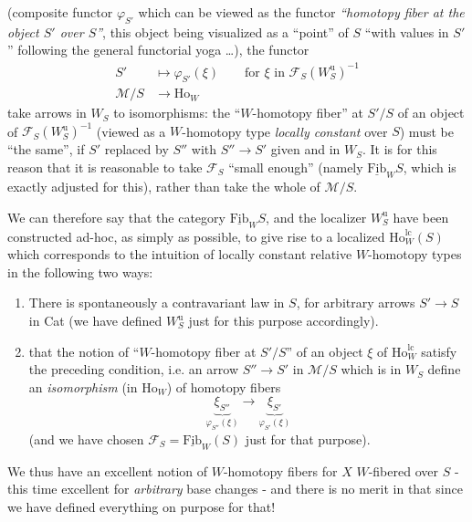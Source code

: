 \documentclass[11pt]{article}
\newcommand{\printedpage}[1]{\marginpar{\footnotesize p.~#1}}
\newcommand{\msp}[1]{\marginpar{\footnotesize [#1]}}
\newcommand{\cM}{\mathcal{M}}
\newcommand{\cF}{\mathcal{F}}
\newcommand{\Ho}{\mathrm{Ho}}
\newcommand{\Fib}{\underline{\mathrm{Fib}}}
\newcommand{\Wu}{W^{\mathrm{u}}}
\newcommand{\lc}{\mathrm{lc}}
\begin{document}
(composite functor $\varphi_{S'}$ which can be viewed as the functor \textit{``homotopy fiber at the object $S'$ over $S$''}, this object being visualized as a ``point'' of $S$ ``with values in $S'$ '' following the general functorial yoga \dots), the functor
\[
\begin{aligned}
S' &\longmapsto \varphi_{S'}(\xi) \qquad \text{for } \xi \text{ in } \cF_S(\Wu_S)^{-1}\\
\cM/S &\longrightarrow \Ho_W
\end{aligned}
\]
take arrows in $W_S$ to isomorphisms: the ``$W$-homotopy fiber'' at $S'/S$ of an object of $\cF_S(\Wu_S)^{-1}$ (viewed as a $W$-homotopy type \textit{locally constant} over $S$) must be ``the same'', if $S'$ replaced by $S''$ with $S'' \longrightarrow S'$ given and in $W_S$. It is for this reason that it is reasonable to take $\cF_S$ ``small enough'' (namely $\Fib_W S$, which is \msp{page 213} exactly adjusted for this), rather than take the whole of $\cM/S$.

We can therefore say that the category $\Fib_W S$, and the localizer $\Wu_S$ have been constructed ad-hoc, as simply as possible, to give rise to a localized $\Ho^{\lc}_W(S)$ which corresponds to the intuition of locally constant relative $W$-homotopy types in the following two ways:

\begin{enumerate}[label={}]
\item[1°)] There is spontaneously a contravariant law in $S$, for arbitrary arrows $S' \longrightarrow S$ in Cat (we have defined $\Wu_S$ just for this purpose accordingly).
\item[2°)] that the notion of ``$W$-homotopy fiber at $S'/S$'' of an object $\xi$ of $\Ho^{\lc}_W$ satisfy the preceding condition, i.e. an arrow $S'' \longrightarrow S'$ in $\cM/S$ which is in $W_S$ define an \textit{isomorphism} (in $\Ho_W$) of homotopy fibers
\[
\underbrace{\xi_{S''}}_{\varphi_{S''}(\xi)} \longrightarrow \underbrace{\xi_{S'}}_{\varphi_{S'}(\xi)}
\]
(and we have chosen $\cF_S = \Fib_W(S)$ just for that purpose).
\end{enumerate}

\printedpage{138}

We thus have an excellent notion of $W$-homotopy fibers for $X$ $W$-fibered over $S$ - this time excellent for \textit{arbitrary} base changes - and there is no merit in that since we have defined everything on purpose for that! %
\end{document}
